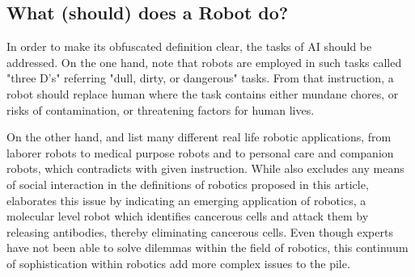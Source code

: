 \documentclass[man]{apa6}
\begin{document}
\subsection{What (should) does a Robot do?}
In order to make its obfuscated definition clear, the tasks of AI should be addressed.
On the one hand,   note that robots are employed in such tasks called "three D's" referring "dull, dirty, or dangerous" tasks.
From that instruction, a robot should replace human where the task contains either mundane chores, or risks of contamination, or threatening factors for human lives.
\par 
\par
On the other hand,  and  list many different real life robotic applications, from laborer robots to medical purpose robots and to personal care and companion robots, which contradicts with given instruction.
While  also excludes any means of social interaction in the definitions of robotics proposed in this article,  elaborates this issue by indicating an emerging application of robotics, a molecular level robot which identifies cancerous cells and attack them by releasing antibodies, thereby eliminating cancerous cells.
Even though experts have not been able to solve dilemmas within the field of robotics, this continuum of sophistication within robotics add more complex issues to the pile.
\par
\end{document}
